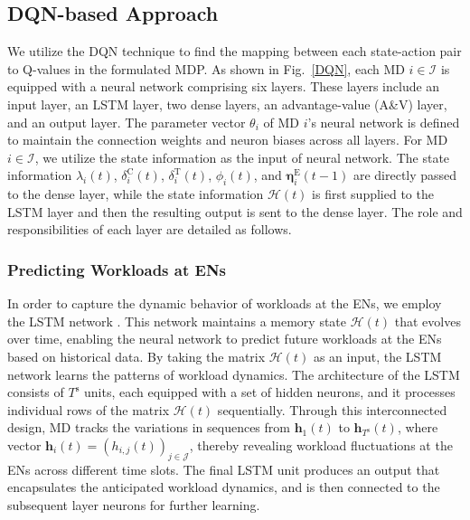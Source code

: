 \documentclass[12pt,draftclsnofoot,onecolumn]{IEEEtran}
\begin{document}
\subsection{DQN-based Approach}
We utilize the DQN technique to find the mapping between each state-action pair to Q-values in the formulated MDP. As shown in Fig.~\ref{DQN}, each MD $i \in \mathcal{I}$ is equipped with a neural network comprising six layers. These layers include an input layer, an LSTM layer, two dense layers, an advantage-value (A\&V) layer, and an output layer. The parameter vector $\theta_i$ of MD $i$'s neural network is defined to maintain the connection weights and neuron biases across all layers. For MD $i \in \mathcal{I}$, we utilize the state information as the input of neural network. The state information $\lambda_i(t)$, $\delta_i^{\text{C}}(t)$, $\delta_i^{\text{T}}(t)$, $\phi_i(t)$, and $\boldsymbol{\eta}_i^{\text{E}}(t-1)$ are directly passed to the dense layer, while the state information $\mathcal{H}(t)$ is first supplied to the LSTM layer and then the resulting output is sent to the dense layer. The role and responsibilities of each layer are detailed as follows.


\subsubsection{Predicting Workloads at ENs}
In order to capture the dynamic behavior of workloads at the ENs, we employ the LSTM network \cite{hochreiter1997long}. This network maintains a memory state $\mathcal{H}(t)$ that evolves over time, enabling the neural network to predict future workloads at the ENs based on historical data. By taking the matrix $\mathcal{H}(t)$ as an input, the LSTM network learns the patterns of workload dynamics. The architecture of the LSTM consists of $T^{\text{s}}$ units, each equipped with a set of hidden neurons, and it processes individual rows of the matrix $\mathcal{H}(t)$ sequentially. Through this interconnected design, MD tracks the variations in sequences from $\boldsymbol{h}_1(t)$ to $\boldsymbol{h}_{T^{\text{s}}}(t)$, where vector $\boldsymbol{h}_i(t) = (h_{i,j}(t))_{j \in \mathcal{J}}$, thereby revealing workload fluctuations at the ENs across different time slots. The final LSTM unit produces an output that encapsulates the anticipated workload dynamics, and is then connected to the subsequent layer neurons for further learning.
\end{document}
